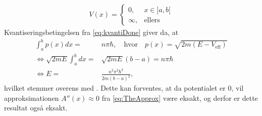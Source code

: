 \begin{align}
    V(x) =
    \begin{cases}
    0, & x\in]a, b[ \\
    \infty, & \text{ellers}
    \end{cases}
\end{align}
Kvantiseringsbetingelsen fra \cref{eq:kvantiDone} giver da, at
\begin{align}
    \int_{a}^{b} p(x) dx = & n\pi \hbar, \quad \text{hvor} \quad p(x) = \sqrt{2m(E-V_{\text{eff}})}\\
    \Leftrightarrow \sqrt{2mE}\int_{a}^{b} dx = & \sqrt{2mE}(b-a) = n\pi \hbar\\
    \Leftrightarrow E = & \frac{n^{2}\pi^{2}\hbar^{2}}{2m(b-a)^{2}},
\end{align}
hvilket stemmer overens med \cite[s. 30]{griffiths}. Dette kan forventes, at da potentialet er $0$, vil approksimationen $A''(x) \approx 0$ fra \cref{eq:TheApprox} være eksakt, og derfor er dette resultat også eksakt.
